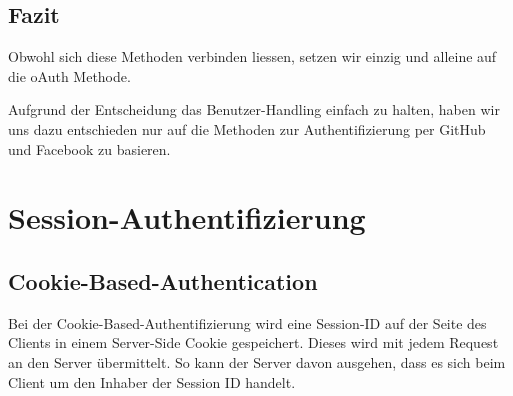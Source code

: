 \subsection{Fazit}
Obwohl sich diese Methoden verbinden liessen, setzen wir einzig und alleine auf die oAuth Methode.
\begin{decision}
Aufgrund der Entscheidung das Benutzer-Handling einfach zu halten, haben wir uns dazu entschieden nur auf die Methoden zur Authentifizierung per GitHub und Facebook zu basieren.
\end{decision}

\section{Session-Authentifizierung}
\subsection{Cookie-Based-Authentication}
Bei der Cookie-Based-Authentifizierung wird eine Session-ID auf der Seite des Clients in einem Server-Side Cookie gespeichert. Dieses wird mit jedem Request an den Server übermittelt. So kann der Server davon ausgehen, dass es sich beim Client um den Inhaber der Session ID handelt.

